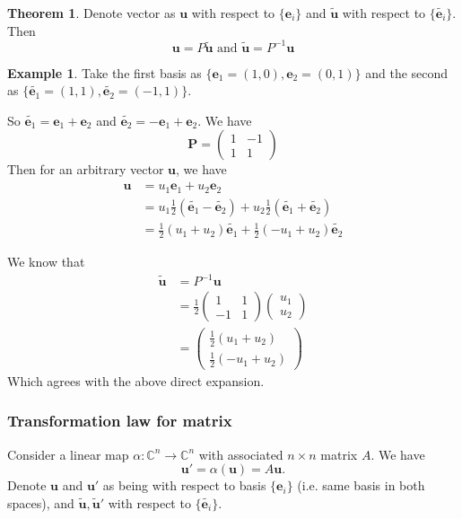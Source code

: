 \documentclass[a4paper]{article}
\theoremstyle{definition}
\newtheorem*{thm}{Theorem}
\newtheorem*{eg}{Example}
\newcommand{\mb}[1]{\mathbf{#1}}
\newcommand{\C}{\mathbb{C}}
\begin{document}
\begin{thm}Denote vector as $\mb{u}$ with respect to $\{\mb{e}_i\}$ and $\tilde{\mb{u}}$ with respect to $\{\tilde{\mb{e}_i}\}$. Then 
  \[
  \mb{u} = P\mb{\tilde{u}}\text{ and }\mb{\tilde{u}} = P^{-1}\mb{u}
  \]
\end{thm}

\begin{eg}
  Take the first basis as $\{\mb{e}_1 = (1, 0), \mb{e}_2 = (0, 1)\}$ and the second as $\{\tilde{\mb{e}_1} = (1, 1), \tilde{\mb{e}_2} = (-1, 1)\}$.

So $\tilde{\mb{e}_1} = \mb{e}_1 + \mb{e}_2$ and $\tilde{\mb{e}_2} = -\mb{e}_1 + \mb{e}_2$. We have
\[
\mb{P} = 
\begin{pmatrix}
  1 & -1\\
  1 & 1
\end{pmatrix}
\]
Then for an arbitrary vector $\mb{u}$, we have
\begin{align*}
  \mb{u}&= u_1\mb{e}_1 + u_2\mb{e}_2\\
  &= u_1\frac{1}{2}(\tilde{\mb{e}_1} - \tilde{\mb{e}_2}) + u_2\frac{1}{2}(\tilde{\mb{e}_1} + \tilde{\mb{e}_2})\\
  &= \frac{1}{2}(u_1 + u_2)\tilde{\mb{e}_1} + \frac{1}{2}(-u_1 + u_2)\tilde{\mb{e}_2}
\end{align*}

We know that
\begin{align*}
  \mb{\tilde{u}} &= P^{-1} \mb{u}\\
  &= \frac{1}{2}
  \begin{pmatrix}
    1&1\\-1&1
  \end{pmatrix}
  \begin{pmatrix}
    u_1\\u_2
  \end{pmatrix}\\
  &= 
  \begin{pmatrix}
    \frac{1}{2}(u_1 + u_2)\\
    \frac{1}{2}(-u_1 + u_2)
  \end{pmatrix}
\end{align*}
Which agrees with the above direct expansion.
\end{eg}
\subsubsection{Transformation law for matrix}
Consider a linear map $\alpha: \C^n \to \C^n$ with associated $n\times n$ matrix $A$. We have
\[
\mb{u}' = \alpha(\mb{u}) = A\mb{u}.
\]
Denote $\mb{u}$ and $\mb{u}'$ as being with respect to basis $\{\mb{e}_i\}$ (i.e. same basis in both spaces), and $\mb{\tilde{u}, \tilde{u}'}$ with respect to $\{\tilde{\mb{e}_i}\}$.
\end{document}
